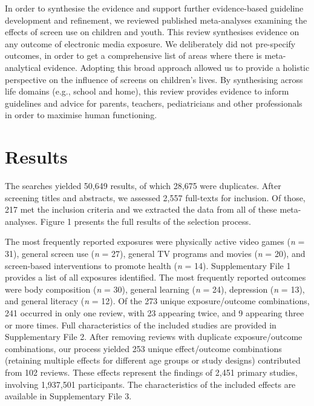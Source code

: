 \documentclass[
  english,
  man]{apa6}
\begin{document}
In order to synthesise the evidence and support further evidence-based guideline development and refinement, we reviewed published meta-analyses examining the effects of screen use on children and youth.
This review synthesises evidence on any outcome of electronic media exposure.
We deliberately did not pre-specify outcomes, in order to get a comprehensive list of areas where there is meta-analytical evidence.
Adopting this broad approach allowed us to provide a holistic perspective on the influence of screens on children's lives.
By synthesising across life domains (e.g., school and home), this review provides evidence to inform guidelines and advice for parents, teachers, pediatricians and other professionals in order to maximise human functioning.

\newpage

\hypertarget{results}{%
\section{Results}\label{results}}

The searches yielded 50,649 results, of which 28,675 were duplicates.
After screening titles and abstracts, we assessed 2,557 full-texts for inclusion.
Of those, 217 met the inclusion criteria and we extracted the data from all of these meta-analyses.
Figure 1 presents the full results of the selection process.

The most frequently reported exposures were physically active video games (\emph{n} = 31), general screen use (\emph{n} = 27), general TV programs and movies (\emph{n} = 20), and screen-based interventions to promote health (\emph{n} = 14).
Supplementary File 1 provides a list of all exposures identified.
The most frequently reported outcomes were body composition (\emph{n} = 30), general learning (\emph{n} = 24), depression (\emph{n} = 13), and general literacy (\emph{n} = 12).
Of the 273 unique exposure/outcome combinations, 241 occurred in only one review, with 23 appearing twice, and 9 appearing three or more times.
Full characteristics of the included studies are provided in Supplementary File 2.
After removing reviews with duplicate exposure/outcome combinations, our process yielded 253 unique effect/outcome combinations (retaining multiple effects for different age groups or study designs) contributed from 102 reviews.
These effects represent the findings of 2,451 primary studies, involving 1,937,501 participants.
The characteristics of the included effects are available in Supplementary File 3.
\end{document}
